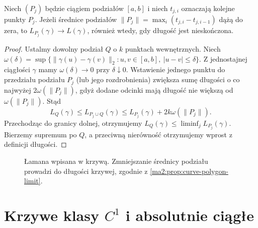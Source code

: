 \begin{stwierdzenie}
\label{ma2:prop:curve-polygon-limit}
Niech $(P_j)$ będzie ciągiem podziałów $[a,b]$
i niech $t_{j,i}$ oznaczają kolejne punkty $P_j$.
Jeżeli średnice podziałów
$\|P_j\|=\max_i(t_{j,i}-t_{j,i-1})$ dążą do zera, to
$L_{P_j}(\gamma)\to L(\gamma)$, również wtedy,
gdy długość jest nieskończona.
\end{stwierdzenie}
\begin{proof}
Ustalmy dowolny podział $Q$ o $k$ punktach wewnętrznych.
Niech $\omega(\delta)=\sup\{\|\gamma(u)-\gamma(v)\|_2:
u,v\in[a,b],\ |u-v|\le\delta\}$.
Z jednostajnej ciągłości $\gamma$ mamy
$\omega(\delta)\to0$ przy $\delta\downarrow0$.
Wstawienie jednego punktu do przedziału podziału
$P_j$ (lub jego rozdrobnienia) zwiększa sumę
długości o co najwyżej $2\omega(\|P_j\|)$,
gdyż dodane odcinki mają długość nie większą
od $\omega(\|P_j\|)$.
Stąd
\[
 L_Q(\gamma)\le L_{P_j\cup Q}(\gamma)
 \le L_{P_j}(\gamma)+2k\omega(\|P_j\|).
\]
Przechodząc do granicy dolnej, otrzymujemy
$L_Q(\gamma)\le\liminf_j L_{P_j}(\gamma)$.
Bierzemy supremum po $Q$, a przeciwną nierówność
otrzymujemy wprost z definicji długości.
\end{proof}

\begin{figure}[htbp]
\centering
{}
\caption{Łamana wpisana w krzywą. Zmniejszanie
średnicy podziału prowadzi do długości krzywej,
zgodnie z \ref{ma2:prop:curve-polygon-limit}.}
\label{ma2:fig:curve-polygon}
\end{figure}

\section{Krzywe klasy \texorpdfstring{$C^1$}{C1} i absolutnie ciągłe}

